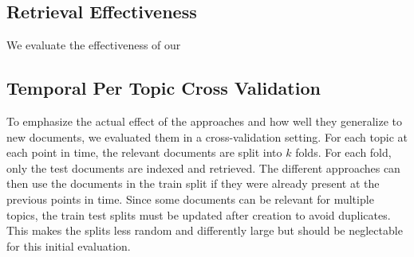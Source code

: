 \subsection{Retrieval Effectiveness}

We evaluate the effectiveness of our 



\subsection{Temporal Per Topic Cross Validation}
To emphasize the actual effect of the approaches and how well they generalize to new documents, we evaluated them in a cross-validation setting. For each topic at each point in time, the relevant documents are split into $k$ folds. For each fold, only the test documents are indexed and retrieved. The different approaches can then use the documents in the train split if they were already present at the previous points in time. Since some documents can be relevant for multiple topics, the train test splits must be updated after creation to avoid duplicates. This makes the splits less random and differently large but should be neglectable for this initial evaluation.



